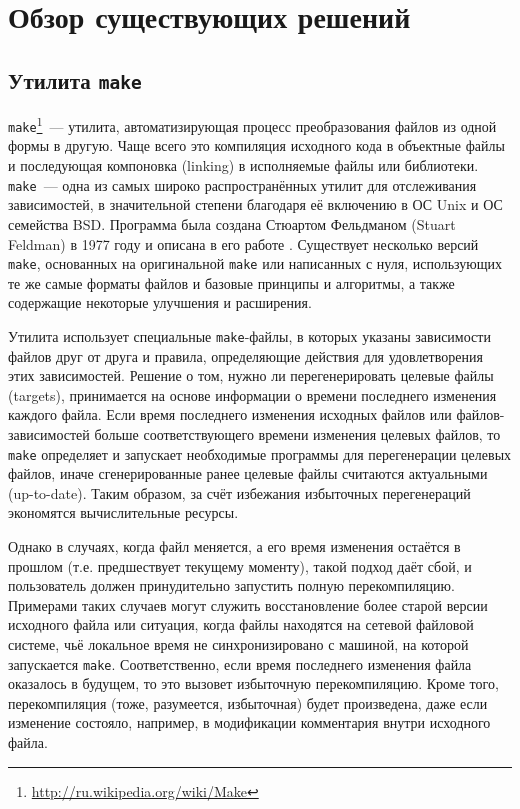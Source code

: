 \section{Обзор существующих решений}

\subsection{Утилита \texttt{make}}
\texttt{make}\footnote{\url{http://ru.wikipedia.org/wiki/Make}}~--- утилита, автоматизирующая процесс преобразования файлов из одной формы в другую. Чаще всего это компиляция исходного кода в объектные файлы и последующая компоновка (linking) в исполняемые файлы или библиотеки. \texttt{make}~--- одна из самых широко распространённых утилит для отслеживания зависимостей, в значительной степени благодаря её включению в ОС Unix и ОС семейства BSD. Программа была создана Стюартом Фельдманом (Stuart Feldman) в 1977 году и описана в его работе \cite{feldman_make}. Существует несколько версий \texttt{make}, основанных на оригинальной \texttt{make} или написанных с нуля, использующих те же самые форматы файлов и базовые принципы и алгоритмы, а также содержащие некоторые улучшения и расширения.

Утилита использует специальные \texttt{make}-файлы, в которых указаны зависимости файлов друг от друга и правила, определяющие действия для удовлетворения этих зависимостей. Решение о том, нужно ли перегенерировать целевые файлы (targets), принимается на основе информации о времени последнего изменения каждого файла. Если время последнего изменения исходных файлов или файлов-зависимостей больше соответствующего времени изменения целевых файлов, то \texttt{make} определяет и запускает необходимые программы для перегенерации целевых файлов, иначе сгенерированные ранее целевые файлы считаются актуальными (up-to-date). Таким образом, за счёт избежания избыточных перегенераций экономятся вычислительные ресурсы.

Однако в случаях, когда файл меняется, а его время изменения остаётся в прошлом (т.е. предшествует текущему моменту), такой подход даёт сбой, и пользователь должен принудительно запустить полную перекомпиляцию. Примерами таких случаев могут служить восстановление более старой версии исходного файла или ситуация, когда файлы находятся на сетевой файловой системе, чьё локальное время не синхронизировано с машиной, на которой запускается \texttt{make}. Соответственно, если время последнего изменения файла оказалось в будущем, то это вызовет избыточную перекомпиляцию. Кроме того, перекомпиляция (тоже, разумеется, избыточная) будет произведена, даже если изменение состояло, например, в модификации комментария внутри исходного файла.

